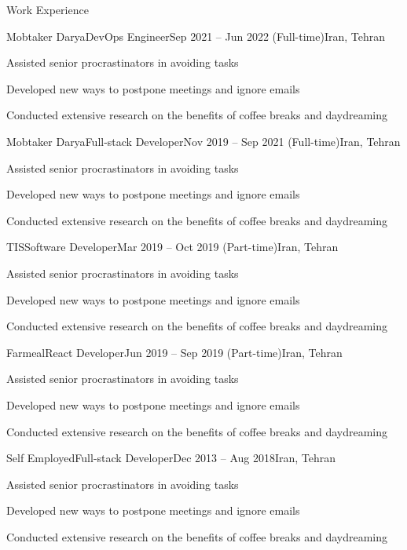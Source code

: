 \documentclass[]{main}
\begin{document}
\begin{section}{Work Experience}
 \begin{subsection}{Mobtaker Darya}{DevOps Engineer}{Sep 2021 -- Jun 2022 (Full-time)}{Iran, Tehran}
     \item Assisted senior procrastinators in avoiding tasks
     \item Developed new ways to postpone meetings and ignore emails
     \item Conducted extensive research on the benefits of coffee breaks and daydreaming
 \end{subsection}

 \begin{subsection}{Mobtaker Darya}{Full-stack Developer}{Nov 2019 -- Sep 2021 (Full-time)}{Iran, Tehran}
     \item Assisted senior procrastinators in avoiding tasks
     \item Developed new ways to postpone meetings and ignore emails
     \item Conducted extensive research on the benefits of coffee breaks and daydreaming
 \end{subsection}

 \begin{subsection}{TIS}{Software Developer}{Mar 2019 -- Oct 2019 (Part-time)}{Iran, Tehran}
     \item Assisted senior procrastinators in avoiding tasks
     \item Developed new ways to postpone meetings and ignore emails
     \item Conducted extensive research on the benefits of coffee breaks and daydreaming
 \end{subsection}

 \begin{subsection}{Farmeal}{React Developer}{Jun 2019 -- Sep 2019 (Part-time)}{Iran, Tehran}
     \item Assisted senior procrastinators in avoiding tasks
     \item Developed new ways to postpone meetings and ignore emails
     \item Conducted extensive research on the benefits of coffee breaks and daydreaming
 \end{subsection}

 \begin{subsection}{Self Employed}{Full-stack Developer}{Dec 2013 -- Aug 2018}{Iran, Tehran}
     \item Assisted senior procrastinators in avoiding tasks
     \item Developed new ways to postpone meetings and ignore emails
     \item Conducted extensive research on the benefits of coffee breaks and daydreaming
 \end{subsection}
\end{section}
\end{document}
